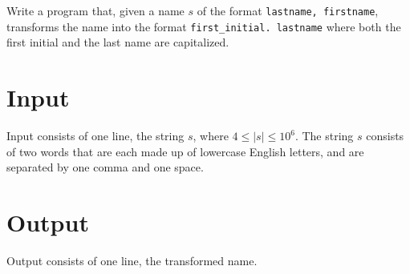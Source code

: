 Write a program that, given a name $s$ of the format \texttt{lastname, firstname},
transforms the name into the format \texttt{first\_initial. lastname}
where both the first initial and the last name are capitalized.

\section*{Input}
Input consists of one line, the string $s$, where $4 \leq |s| \leq 10^6$.
The string $s$ consists of two words that are each made up of lowercase English letters, and are separated by one comma and one space.

\section*{Output}
Output consists of one line, the transformed name.
